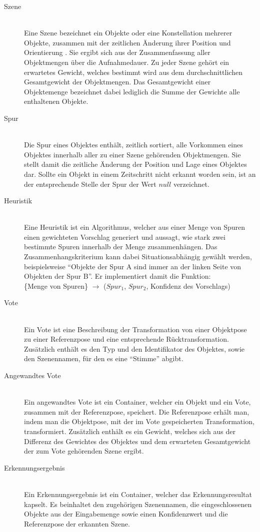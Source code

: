 \begin{description}
  \item[Szene] \hfill \\
  Eine Szene bezeichnet ein Objekte oder eine Konstellation mehrerer Objekte, zusammen mit der zeitlichen Änderung ihrer Position und Orientierung .
  Sie ergibt sich aus der Zusammenfassung aller Objektmengen über die Aufnahmedauer.
  Zu jeder Szene gehört ein erwartetes Gewicht, welches bestimmt wird aus dem durchschnittlichen Gesamtgewicht der Objektmengen.
  Das Gesamtgewicht einer Objektemenge bezeichnet dabei lediglich die Summe der Gewichte alle enthaltenen Objekte.

  \item[Spur] \hfill \\
  Die Spur eines Objektes enthält, zeitlich sortiert, alle Vorkommen eines Objektes innerhalb aller zu einer Szene gehörenden Objektmengen.
  Sie stellt damit die zeitliche Änderung der Position und Lage eines Objektes dar.
  Sollte ein Objekt in einem Zeitschritt nicht erkannt worden sein, ist an der entsprechende Stelle der Spur der Wert $null$ verzeichnet.

  \item[Heuristik] \hfill \\
  Eine Heuristik ist ein Algorithmus, welcher aus einer Menge von Spuren einen gewichteten Vorschlag generiert und aussagt, wie stark zwei bestimmte Spuren innerhalb der Menge zusammenhängen.
  Das Zusammenhangskriterium kann dabei Situationsabhängig gewählt werden, beispielsweise "`Objekte der Spur A sind immer an der linken Seite von Objekten der Spur B"'.
  Er implementiert damit die Funktion:\\
  \{Menge von Spuren\} $\rightarrow$ ($Spur_1$, $Spur_2$, Konfidenz des Vorschlags)

  \item[Vote] \hfill \\
    Ein Vote ist eine Beschreibung der Transformation von einer Objektpose zu einer Referenzpose und eine entsprechende Rücktransformation.
    Zusätzlich enthält es den Typ und den Identifikator des Objektes, sowie den Szenennamen, für den es eine "`Stimme"' abgibt.

  \item[Angewandtes Vote] \hfill \\
    Ein angewandtes Vote ist ein Container, welcher ein Objekt und ein Vote, zusammen mit der Referenzpose, speichert.
    Die Referenzpose erhält man, indem man die Objektpose, mit der im Vote gespeicherten Transformation, transformiert.
    Zusätzlich enthält es ein Gewicht, welches sich aus der Differenz des Gewichtes des Objektes und dem erwarteten Gesamtgewicht der zum Vote gehörenden Szene ergibt.
 
  \item[Erkennungsergebnis] \hfill \\
    Ein Erkennungsergebnis ist ein Container, welcher das Erkennungsresultat kapselt.
    Es beinhaltet den zugehörigen Szenennamen, die eingeschlossenen Objekte aus der Eingabemenge sowie einen Konfidenzwert und die Referenzpose der erkannten Szene.

\end{description}

